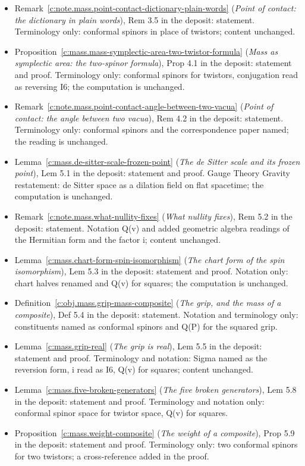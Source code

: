 \documentclass[11pt]{article}
\theoremstyle{definition}
\theoremstyle{plain}
\begin{document}
\begin{itemize}
\item Remark~\ref{c:note.mass.point-contact-dictionary-plain-words} (\emph{Point of contact: the dictionary in plain words}), Rem 3.5 in the deposit: statement. Terminology only: conformal spinors in place of twistors; content unchanged.
\item Proposition~\ref{c:mass.mass-symplectic-area-two-twistor-formula} (\emph{Mass as symplectic area: the two-spinor formula}), Prop 4.1 in the deposit: statement and proof. Terminology only: conformal spinors for twistors, conjugation read as reversing I6; the computation is unchanged.
\item Remark~\ref{c:note.mass.point-contact-angle-between-two-vacua} (\emph{Point of contact: the angle between two vacua}), Rem 4.2 in the deposit: statement. Terminology only: conformal spinors and the correspondence paper named; the reading is unchanged.
\item Lemma~\ref{c:mass.de-sitter-scale-frozen-point} (\emph{The de Sitter scale and its frozen point}), Lem 5.1 in the deposit: statement and proof. Gauge Theory Gravity restatement: de Sitter space as a dilation field on flat spacetime; the computation is unchanged.
\item Remark~\ref{c:note.mass.what-nullity-fixes} (\emph{What nullity fixes}), Rem 5.2 in the deposit: statement. Notation Q(v) and added geometric algebra readings of the Hermitian form and the factor i; content unchanged.
\item Lemma~\ref{c:mass.chart-form-spin-isomorphism} (\emph{The chart form of the spin isomorphism}), Lem 5.3 in the deposit: statement and proof. Notation only: chart halves renamed and Q(v) for squares; the computation is unchanged.
\item Definition~\ref{c:obj.mass.grip-mass-composite} (\emph{The grip, and the mass of a composite}), Def 5.4 in the deposit: statement. Notation and terminology only: constituents named as conformal spinors and Q(P) for the squared grip.
\item Lemma~\ref{c:mass.grip-real} (\emph{The grip is real}), Lem 5.5 in the deposit: statement and proof. Terminology and notation: Sigma named as the reversion form, i read as I6, Q(v) for squares; content unchanged.
\item Lemma~\ref{c:mass.five-broken-generators} (\emph{The five broken generators}), Lem 5.8 in the deposit: statement and proof. Terminology and notation only: conformal spinor space for twistor space, Q(v) for squares.
\item Proposition~\ref{c:mass.weight-composite} (\emph{The weight of a composite}), Prop 5.9 in the deposit: statement and proof. Terminology only: two conformal spinors for two twistors; a cross-reference added in the proof.

\end{itemize}
\end{document}
